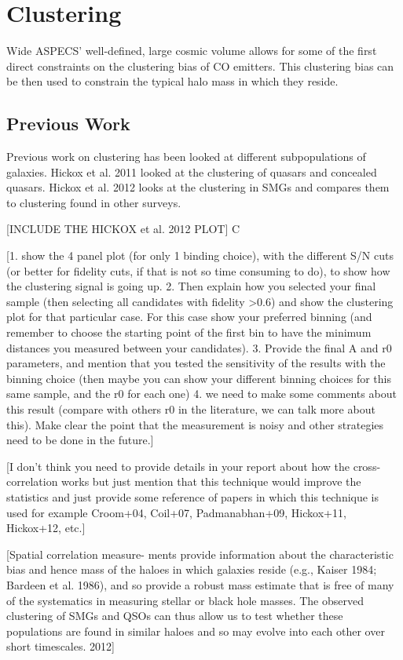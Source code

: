 \chapter{Clustering}

Wide ASPECS' well-defined, large cosmic volume allows for some of the first direct constraints on the clustering bias of CO emitters. This clustering bias can be then used to constrain the typical halo mass in which they reside. 

\section{Previous Work}

Previous work on clustering has been looked at different subpopulations of galaxies. Hickox et al. 2011 looked at the clustering of quasars and concealed quasars. Hickox et al. 2012 looks at the clustering in SMGs and compares them to clustering found in other surveys. 


[INCLUDE THE HICKOX et al. 2012 PLOT]
C

[1. show the 4 panel plot (for only 1 binding choice), with the different S/N cuts (or better for fidelity cuts, if that is not so time consuming to do), to show how the clustering signal is going up. 
2. Then explain how you selected your final sample (then selecting all candidates with fidelity >0.6) and show the clustering plot for that particular case. For this case show your preferred binning (and remember to choose the starting point of the first bin to have the minimum distances you measured between your candidates). 
3. Provide the final A and r0 parameters, and mention that you tested the sensitivity of the results with the binning choice (then maybe you can show your different binning choices for this same sample, and the r0 for each one)
4. we need to make some comments about this result (compare with others r0 in the literature, we can talk more about this). Make clear the point that the measurement is noisy and other strategies need to be done in the future.]

[I don’t think you need to provide details in your report about how the cross-correlation works but just mention that this technique would improve the statistics and just provide some reference of papers in which this technique is used for example Croom+04, Coil+07, Padmanabhan+09, Hickox+11, Hickox+12, etc.]

[Spatial correlation measure-
ments provide information about the characteristic bias and hence
mass of the haloes in which galaxies reside (e.g., Kaiser 1984;
Bardeen et al. 1986), and so provide a robust mass estimate that is
free of many of the systematics in measuring stellar or black hole
masses. The observed clustering of SMGs and QSOs can thus allow
us to test whether these populations are found in similar haloes and
so may evolve into each other over short timescales. \cite{hickox2011clustering} 2012]

